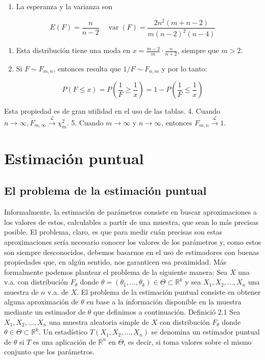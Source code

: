\documentclass[
]{article}
\providecommand{\tightlist}{%
  \setlength{\itemsep}{0pt}\setlength{\parskip}{0pt}}
\begin{document}
\begin{enumerate}
\def\labelenumi{\arabic{enumi}.}
\tightlist
\item
  La esperanza y la varianza son
\end{enumerate}

\[
E(F)=\frac{n}{n-2} \quad \operatorname{var}(F)=\frac{2 n^{2}(m+n-2)}{m(n-2)^{2}(n-4)}
\]

\begin{enumerate}
\def\labelenumi{\arabic{enumi}.}
\setcounter{enumi}{1}
\tightlist
\item
  Esta distribución tiene una moda en \(x=\frac{m-2}{m} \cdot \frac{n}{n+2}\), siempre que \(m>2\).
\item
  Si \(F \sim F_{m, n}\), entonces resulta que \(1 / F \sim F_{n, m}\) y por lo tanto:
\end{enumerate}

\[
P(F \leq x)=P\left(\frac{1}{F} \geq \frac{1}{x}\right)=1-P\left(\frac{1}{F} \leq \frac{1}{x}\right)
\]

Esta propiedad es de gran utilidad en el uso de las tablas.
4. Cuando \(n \rightarrow \infty, F_{m, \infty} \xrightarrow{\mathcal{L}} \chi_{m}^{2}\).
5. Cuando \(m \rightarrow \infty\) y \(n \rightarrow \infty\), entonces \(F_{m, n} \xrightarrow{\mathcal{L}} 1\).

\section{Estimación puntual}\label{estimaciuxf3n-puntual}

\subsection{El problema de la estimación puntual}\label{el-problema-de-la-estimaciuxf3n-puntual}

Informalmente, la estimación de parámetros consiste en buscar aproximaciones a los valores de estos, calculables a partir de una muestra, que sean lo más precisas posible. El problema, claro, es que para medir cuán precisas son estas aproximaciones sería necesario conocer los valores de los parámetros y, como estos son siempre desconocidos, debemos basarnos en el uso de estimadores con buenas propiedades que, en algún sentido, nos garanticen esa proximidad.
Más formalmente podemos plantear el problema de la siguiente manera:
Sea \(X\) una v.a. con distribución \(F_{\theta}\) donde \(\theta=\left(\theta_{1}, \ldots, \theta_{k}\right) \in \Theta \subset \mathbb{R}^{k}\) y sea \(X_{1}, X_{2}, \ldots, X_{n}\) una muestra de \(n\) v.a. de \(X\). El problema de la estimación puntual consiste en obtener alguna aproximación de \(\theta\) en base a la información disponible en la muestra mediante un estimador de \(\theta\) que definimos a continuación.
Definició 2.1 Sea \(X_{1}, X_{2}, \ldots, X_{n}\) una muestra aleatoria simple de \(X\) con distribución \(F_{\theta}\) donde \(\theta \in \Theta \subset \mathbb{R}^{k}\). Un estadístico \(T\left(X_{1}, X_{2}, \ldots, X_{n}\right)\) se denomina un estimador puntual de \(\theta\) si \(T\) es una aplicación de \(\mathbb{R}^{n}\) en \(\Theta\), es decir, si toma valores sobre el mismo conjunto que los parámetros.
\end{document}
